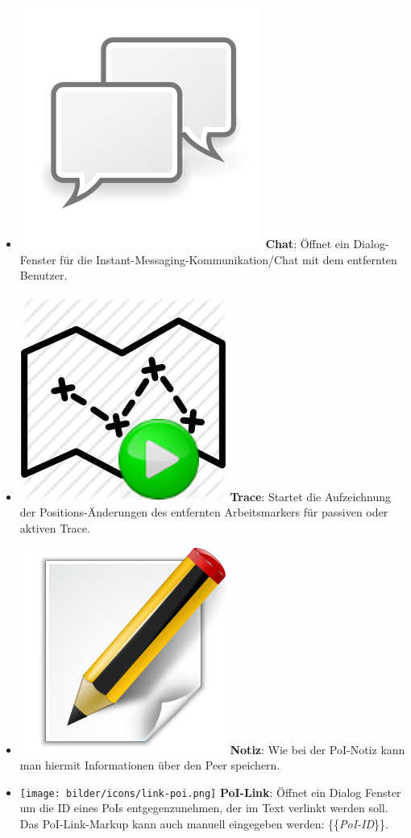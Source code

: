 \begin{itemize}[leftmargin=*,noitemsep,topsep=1ex,parsep=0pt,partopsep=0pt]
\item \includegraphics[scale=1.1]{bilder/icons/p2p-chat.png} \textbf{Chat}: Öffnet ein Dialog-Fenster für die Instant-Messaging-Kommunikation/Chat mit dem entfernten Benutzer. 
\item \includegraphics[scale=0.04]{bilder/icons/start_trace.png} \textbf{Trace}: Startet die Aufzeichnung der Positions-Änderungen des entfernten Arbeitsmarkers für passiven oder aktiven Trace.
\item \includegraphics[scale=0.07]{bilder/icons/edit-note.png} \textbf{Notiz}: Wie bei der PoI-Notiz kann man hiermit Informationen über den Peer speichern.
\item \texttt{[image: bilder/icons/link-poi.png]} \textbf{PoI-Link}: Öffnet ein Dialog Fenster um die ID eines PoIs entgegenzunehmen, der im Text verlinkt werden soll. Das PoI-Link-Markup kann auch manuell eingegeben werden: \{\{\textit{PoI-ID}\}\}.
\end{itemize}
